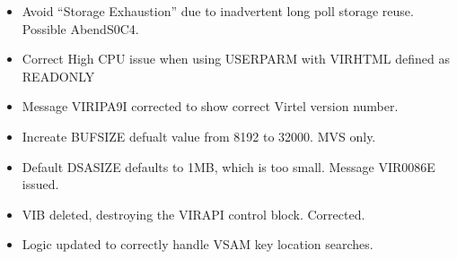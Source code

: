\documentclass[letterpaper,10pt,english]{sphinxmanual}
\begin{document}
\begin{itemize}
\item {} 
Avoid “Storage Exhaustion” due to inadvertent long poll storage reuse. Possible AbendS0C4.

\end{itemize}

\begin{itemize}
\item {} 
Correct High CPU issue when using USERPARM with VIRHTML defined as READONLY

\end{itemize}

\begin{itemize}
\item {} 
Message VIRIPA9I corrected to show correct Virtel version number.

\end{itemize}

\begin{itemize}
\item {} 
Increate BUFSIZE defualt value from 8192 to 32000. MVS only.

\end{itemize}

\begin{itemize}
\item {} 
Default DSASIZE defaults to 1MB, which is too small. Message VIR0086E issued.

\end{itemize}

\begin{itemize}
\item {} 
VIB deleted, destroying the VIRAPI control block. Corrected.

\end{itemize}

\begin{itemize}
\item {} 
Logic updated to correctly handle VSAM key location searches.

\end{itemize}
\end{document}
